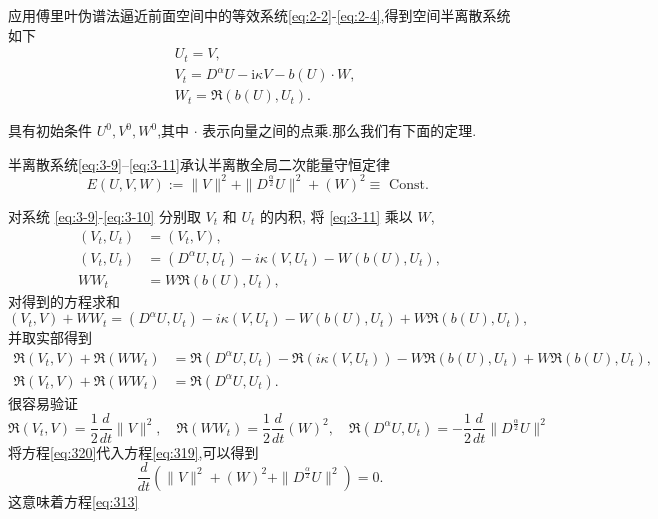 应用傅里叶伪谱法逼近前面空间中的等效系统\eqref{eq:2-2}-\eqref{eq:2-4},得到空间半离散系统如下
\begin{align}
	& U_t=V, \label{eq:3-9}\\
	& V_t=D^{\alpha} U-\mathrm{i}\kappa V- b(U) \cdot W, \label{eq:3-10}\\
	& W_t=\Re\left(b(U), U_t\right) .\label{eq:3-11}
	\end{align}

	具有初始条件 $U^0, V^0, W^0$,其中 $\cdot$ 表示向量之间的点乘.那么我们有下面的定理.
    \begin{thm}	\label{thm3}
        半离散系统\eqref{eq:3-9}–\eqref{eq:3-11}承认半离散全局二次能量守恒定律
\begin{equation}
	E(U,V,W):=\|V\|^2 + \|D^\frac{\alpha}{2} U\|^2+\left(W\right)^2 \equiv \text { Const. }\label{eq:313}
	\end{equation}
\end{thm}

\begin{pf}
    对系统 \eqref{eq:3-9}-\eqref{eq:3-10} 分别取 $V_t$ 和 $U_t$ 的内积,
    将 \eqref{eq:3-11} 乘以 $W$,
\begin{align}
	  \left(V_t, U_t\right)&=\left(V_t, V\right), \\
	 \left(V_t, U_t\right)&=\left(D^{\alpha} U, U_t\right)-i \kappa\left(V, U_t\right)-W\left(b(U), U_t\right), \\
	 W W_t&=W\Re\left(b(U), U_t\right),
	\end{align}
    对得到的方程求和
\begin{equation}
	\left(V_t, V\right) + W W_t= \left(D^{\alpha} U, U_t\right)-i \kappa\left(V, U_t\right)-W\left(b(U), U_t\right) + W\Re\left(b(U), U_t\right),
\end{equation}
并取实部得到
\begin{align}
	\Re\left(V_t, V\right) + \Re\left(W W_t\right)&= \Re\left(D^{\alpha} U, U_t\right)-\Re\left(i \kappa\left(V, U_t\right)\right)-W\Re\left(b(U), U_t\right) + W\Re\left(b(U), U_t\right),\\
	\Re\left(V_t, V\right) + \Re\left(W W_t\right)&= \Re\left(D^{\alpha} U, U_t\right).\label{eq:319}
\end{align}
很容易验证
\begin{equation}
	\Re\left(V_t, V\right) = \frac{1}{2}\frac{d }{d t}\|V\|^2, \quad \Re\left(W W_t\right) = \frac{1}{2}\frac{d }{d t}\left(W\right)^2,\quad \Re\left(D^{\alpha} U, U_t\right)=-\frac{1}{2}\frac{d }{d t}\|D^\frac{\alpha}{2}U\|^2\label{eq:320}
\end{equation}
将方程\eqref{eq:320}代入方程\eqref{eq:319},可以得到
\begin{equation}
	\frac{d }{d t}\left(\|V\|^2+\left(W\right)^2+\|D^\frac{\alpha}{2}U\|^2\right)=0.
\end{equation}
这意味着方程\eqref{eq:313}
\end{pf}
